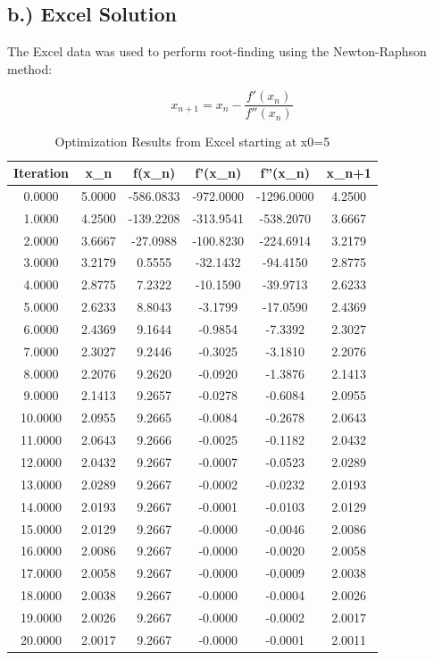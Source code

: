 \documentclass{article}%
\begin{document}
%
\subsection*{b.) Excel Solution}%
\label{subsec:b.)ExcelSolution}%
The Excel data was used to perform root{-}finding using the Newton{-}Raphson method:%
\par%
\[%
x_{n+1} = x_n - \frac{f'(x_n)}{f''(x_n)}%
\]%
\begin{table}[H]%
\centering%
\begin{tabular}{cccccc}%
\hline%
Iteration&x\_n&f(x\_n)&f'(x\_n)&f''(x\_n)&x\_n+1\\%
\hline%
0.0000&5.0000&{-}586.0833&{-}972.0000&{-}1296.0000&4.2500\\%
\hline%
1.0000&4.2500&{-}139.2208&{-}313.9541&{-}538.2070&3.6667\\%
\hline%
2.0000&3.6667&{-}27.0988&{-}100.8230&{-}224.6914&3.2179\\%
\hline%
3.0000&3.2179&0.5555&{-}32.1432&{-}94.4150&2.8775\\%
\hline%
4.0000&2.8775&7.2322&{-}10.1590&{-}39.9713&2.6233\\%
\hline%
5.0000&2.6233&8.8043&{-}3.1799&{-}17.0590&2.4369\\%
\hline%
6.0000&2.4369&9.1644&{-}0.9854&{-}7.3392&2.3027\\%
\hline%
7.0000&2.3027&9.2446&{-}0.3025&{-}3.1810&2.2076\\%
\hline%
8.0000&2.2076&9.2620&{-}0.0920&{-}1.3876&2.1413\\%
\hline%
9.0000&2.1413&9.2657&{-}0.0278&{-}0.6084&2.0955\\%
\hline%
10.0000&2.0955&9.2665&{-}0.0084&{-}0.2678&2.0643\\%
\hline%
11.0000&2.0643&9.2666&{-}0.0025&{-}0.1182&2.0432\\%
\hline%
12.0000&2.0432&9.2667&{-}0.0007&{-}0.0523&2.0289\\%
\hline%
13.0000&2.0289&9.2667&{-}0.0002&{-}0.0232&2.0193\\%
\hline%
14.0000&2.0193&9.2667&{-}0.0001&{-}0.0103&2.0129\\%
\hline%
15.0000&2.0129&9.2667&{-}0.0000&{-}0.0046&2.0086\\%
\hline%
16.0000&2.0086&9.2667&{-}0.0000&{-}0.0020&2.0058\\%
\hline%
17.0000&2.0058&9.2667&{-}0.0000&{-}0.0009&2.0038\\%
\hline%
18.0000&2.0038&9.2667&{-}0.0000&{-}0.0004&2.0026\\%
\hline%
19.0000&2.0026&9.2667&{-}0.0000&{-}0.0002&2.0017\\%
\hline%
20.0000&2.0017&9.2667&{-}0.0000&{-}0.0001&2.0011\\%
\hline%
\end{tabular}%
\caption{Optimization Results from Excel starting at x0=5}%
\end{table}%
\end{document}
